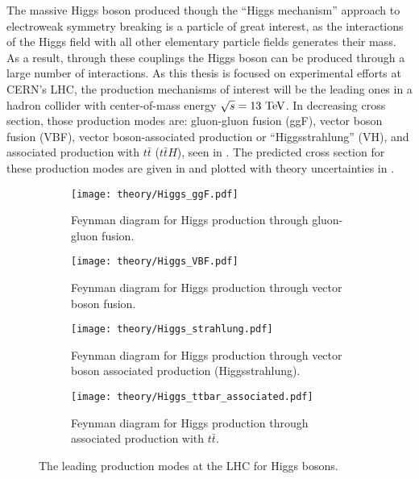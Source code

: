 The massive Higgs boson produced though the ``Higgs mechanism'' approach to electroweak symmetry breaking is a particle of great interest, as the interactions of the Higgs field with all other elementary particle fields generates their mass.
As a result, through these couplings the Higgs boson can be produced through a large number of interactions.
As this thesis is focused on experimental efforts at CERN's \gls{LHC}, the production mechanisms of interest will be the leading ones in a hadron collider with center-of-mass energy $\sqrt{s}=13~\mathrm{TeV}$.
In decreasing cross section, those production modes are: gluon-gluon fusion (ggF), vector boson fusion (VBF), vector boson-associated production or ``Higgsstrahlung'' (VH), and associated production with $t\bar{t}$ ($t\bar{t}H$), seen in .
The predicted cross section for these production modes are given in  and plotted with theory uncertainties in .

\begin{figure}[htbp]
 \centering
 \begin{subfigure}[t]{0.48\textwidth}
  \centering
  \texttt{[image: theory/Higgs\_ggF.pdf]}
  \caption[Feynman diagram for Higgs production through gluon-gluon fusion.]{%
   Feynman diagram for Higgs production through gluon-gluon fusion.}
  \label{fig:Higgs_ggF}
 \end{subfigure}%
 \quad
 \begin{subfigure}[t]{0.48\textwidth}
  \centering
  \texttt{[image: theory/Higgs\_VBF.pdf]}
  \caption[Feynman diagram for Higgs production through vector boson fusion.]{%
   Feynman diagram for Higgs production through vector boson fusion.}
  \label{fig:Higgs_VBF}
 \end{subfigure}%

 \begin{subfigure}[t]{0.48\textwidth}
  \centering
  \texttt{[image: theory/Higgs\_strahlung.pdf]}
  \caption[Feynman diagram for Higgs production through vector boson associated production (Higgsstrahlung).]{%
   Feynman diagram for Higgs production through vector boson associated production (Higgsstrahlung).}
  \label{fig:Higgs_associated_production}
 \end{subfigure}%
 \quad
 \begin{subfigure}[t]{0.48\textwidth}
  \centering
  \texttt{[image: theory/Higgs\_ttbar\_associated.pdf]}
  \caption[Feynman diagram for Higgs production through associated production with $t\bar{t}$.]{%
   Feynman diagram for Higgs production through associated production with $t\bar{t}$.}
  \label{fig:Higgs_associated_production_ttbar}
 \end{subfigure}%
 \caption[The leading production modes at the LHC for Higgs bosons.]{%
  The leading production modes at the LHC for Higgs bosons.}
 \label{fig:Higgs_production_diagrams}
\end{figure}

